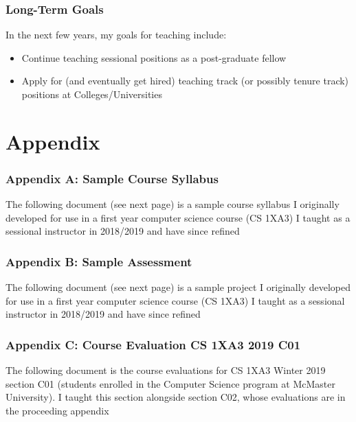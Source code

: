 \documentclass[12pt]{report}
\begin{document}
\section{Long-Term Goals}
\label{sec:orgf6db81d}

In the next few years, my goals for teaching include:
\begin{itemize}
\item Continue teaching sessional positions as a post-graduate fellow
\item Apply for (and eventually get hired) teaching track (or possibly tenure
track) positions at Colleges/Universities
\end{itemize}

\part{Appendix}
\label{sec:orgc638041}
\appendix
\section{Appendix A: Sample Course Syllabus}
\label{sec:orgb9daa55}
 \label{sec:syllabus}
The following document (see next page) is a sample course syllabus I originally
developed for use in a first year computer science course (CS 1XA3) I taught
as a sessional instructor in 2018/2019 and have since refined



\section{Appendix B: Sample Assessment}
\label{sec:org2061746}
 \label{sec:assessment}
The following document (see next page) is a sample project I originally
developed for use in a first year computer science course (CS 1XA3) I taught
as a sessional instructor in 2018/2019 and have since refined



\section{Appendix C: Course Evaluation CS 1XA3 2019 C01}
\label{sec:org5e72588}
 \label{sec:1xa3c01evals}
The following document is the course evaluations for CS 1XA3 Winter 2019 section C01
(students enrolled in the Computer Science program at McMaster University). I
taught this section alongside section C02, whose evaluations are in the
proceeding appendix
\end{document}
